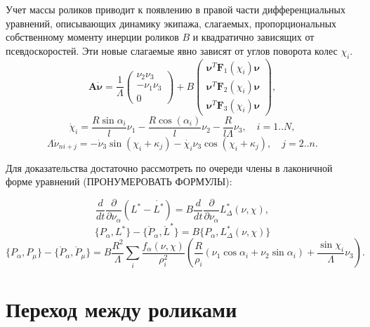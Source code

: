 \begin{stmt}
    Учет массы роликов приводит к появлению в правой части дифференциальных уравнений, описывающих динамику экипажа, слагаемых, пропорциональных собственному моменту инерции роликов $B$ и квадратично зависящих от псевдоскоростей. Эти новые слагаемые явно зависят от углов поворота колес $\chi_i$.
    $$\boldsymbol{A}\dot{\boldsymbol{\nu}} = \frac1\Lambda
    \left(
    \begin{array}{c}
         \nu_2\nu_3  \\
         -\nu_1\nu_3 \\
         0
    \end{array}
    \right) + B
     \left(
    \begin{array}{c}
         \boldsymbol{\nu}^T\boldsymbol{F}_1(\chi_i)\boldsymbol{\nu}  \\
         \boldsymbol{\nu}^T\boldsymbol{F}_2(\chi_i)\boldsymbol{\nu} \\
         \boldsymbol{\nu}^T\boldsymbol{F}_3(\chi_i)\boldsymbol{\nu}
    \end{array}
    \right),
    $$
    $$
    \dot{\chi}_i = \frac{R\sin\alpha_i}{l}\nu_1 - \frac{R\cos(\alpha_i)}{l}\nu_2 - \frac{R}{l\Lambda}\nu_3, \quad i = 1..N,
    $$
    $$
    \Lambda\dot{\nu}_{ni+j} = -\dot{\nu}_3\sin(\chi_i+\kappa_j) - \dot{\chi_i}\nu_3\cos(\chi_i+\kappa_j), \quad j = 2..n.
    $$
\end{stmt}

Для доказательства достаточно рассмотреть по очереди члены в лаконичной форме уравнений (ПРОНУМЕРОВАТЬ ФОРМУЛЫ):

$$ \frac{d}{dt}\frac{\partial }{\partial \nu_\alpha}(L^{*} - \mathring{L^{*}}) = B\frac{d}{dt}\frac{\partial}{\partial \nu_\alpha}L^{*}_\Delta(\nu, \chi), $$
$$ \{P_\alpha, L^{*}\} - \{\mathring{P}_\alpha, \mathring{L}^{*}\} = B\{ P_\alpha, L^{*}_\Delta(\nu, \chi) \} $$
$$\{P_\alpha, P_\mu\} - \{\mathring{P}_\alpha, \mathring{P}_\mu\} = B\frac{R^2}{\Lambda}\sum_i\frac{f_\alpha(\nu, \chi)}{\rho^2_i}(\frac{R}{\rho_i}(\nu_1\cos\alpha_i + \nu_2\sin\alpha_i) + \frac{\sin\chi_i}{\Lambda}\nu_3).$$



\section{Переход между роликами}

